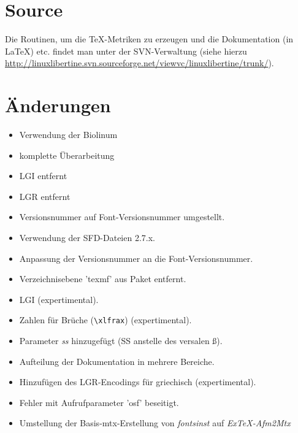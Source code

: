\documentclass{fontdokuold}
\begin{document}
\section{Source}

Die Routinen, um die \TeX-Metriken zu erzeugen und die Dokumentation (in \LaTeX) etc. findet man unter der SVN-Verwaltung (siehe hierzu \url{http://linuxlibertine.svn.sourceforge.net/viewvc/linuxlibertine/trunk/}).


\section{Änderungen}

\begin{description}
\item [29. März 2009]
\begin{itemize}
\item Verwendung der Biolinum
\item komplette Überarbeitung
\item LGI entfernt
\item LGR entfernt
\item Versionsnummer auf Font-Versionsnummer umgestellt.
\end{itemize}
\item [08. Januar 2008]
\begin{itemize}
\item Verwendung der SFD-Dateien 2.7.x.
\item Anpassung der Versionsnummer an die Font-Versionsnummer.
\item Verzeichnisebene 'texmf' aus Paket entfernt.
\item LGI (expertimental).
\item Zahlen für Brüche (\verb|\xlfrax|) (expertimental).
\item Parameter \emph{ss} hinzugefügt (SS anstelle des versalen ß).
\item Aufteilung der Dokumentation in mehrere Bereiche.
\item Hinzufügen des LGR-Encodings für griechisch (expertimental).
\item Fehler mit Aufrufparameter 'osf' beseitigt.
\end{itemize}
\item [11. Juni 2007]
\begin{itemize}
\item Umstellung der Basis-mtx-Erstellung von \emph{fontsinst} auf \emph{ExTeX-Afm2Mtx}

\end{itemize}
\end{description}
\end{document}
